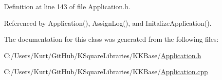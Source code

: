 Definition at line 143 of file Application.\+h.



Referenced by Application(), Assign\+Log(), and Initalize\+Application().



The documentation for this class was generated from the following files\+:\begin{DoxyCompactItemize}
\item 
C\+:/\+Users/\+Kurt/\+Git\+Hub/\+K\+Square\+Libraries/\+K\+K\+Base/\hyperlink{_application_8h}{Application.\+h}\item 
C\+:/\+Users/\+Kurt/\+Git\+Hub/\+K\+Square\+Libraries/\+K\+K\+Base/\hyperlink{_application_8cpp}{Application.\+cpp}\end{DoxyCompactItemize}
